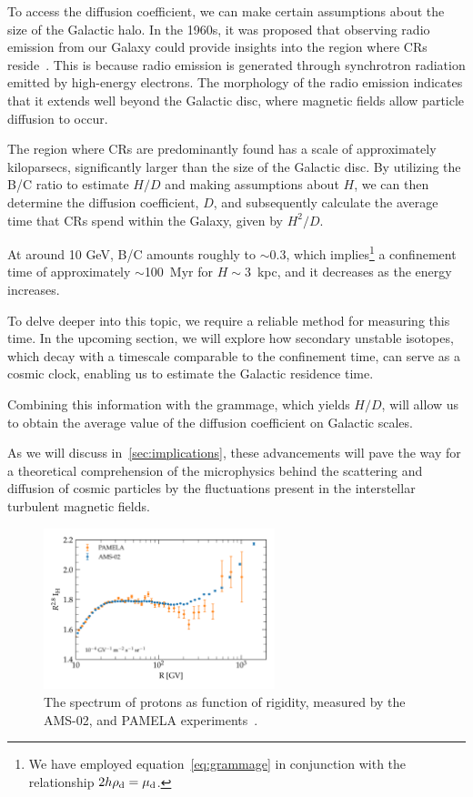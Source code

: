 To access the diffusion coefficient, we can make certain assumptions about the size of the Galactic halo. 
%
In the 1960s, it was proposed that observing radio emission from our Galaxy could provide insights into the region where CRs reside~\cite{Ginzburg1961ptps}. This is because radio emission is generated through synchrotron radiation emitted by high-energy electrons. The morphology of the radio emission indicates that it extends well beyond the Galactic disc, where magnetic fields allow particle diffusion to occur.

The region where CRs are predominantly found has a scale of approximately kiloparsecs, significantly larger than the size of the Galactic disc. By utilizing the B/C ratio to estimate $H/D$ and making assumptions about $H$, we can then determine the diffusion coefficient, $D$, and subsequently calculate the average time that CRs spend within the Galaxy, given by $H^2/D$. 

At around 10 GeV, B/C amounts roughly to $\sim 0.3$, which implies\footnote{We have employed equation~\eqref{eq:grammage} in conjunction with the relationship $2h \rho_{\rm d} = \mu_{\rm d}$.} a confinement time of approximately $\sim$100~Myr for $H \sim 3$~kpc, and it decreases as the energy increases.

To delve deeper into this topic, we require a reliable method for measuring this time. In the upcoming section, we will explore how secondary unstable isotopes, which decay with a timescale comparable to the confinement time, can serve as a cosmic clock, enabling us to estimate the Galactic residence time.

Combining this information with the grammage, which yields $H/D$, will allow us to obtain the average value of the diffusion coefficient on Galactic scales.

As we will discuss in~\cref{sec:implications}, these advancements will pave the way for a theoretical comprehension of the microphysics behind the scattering and diffusion of cosmic particles by the fluctuations present in the interstellar turbulent magnetic fields.

\begin{figure}
\centering
\includegraphics[width=0.6\textwidth]{figures/protons_he.pdf}
\caption{The spectrum of protons as function of rigidity, measured by the AMS-02, and PAMELA experiments~\cite{AMS02results,PAMELA.2011.proton}.}
\label{fig:protonshe}
\end{figure}

